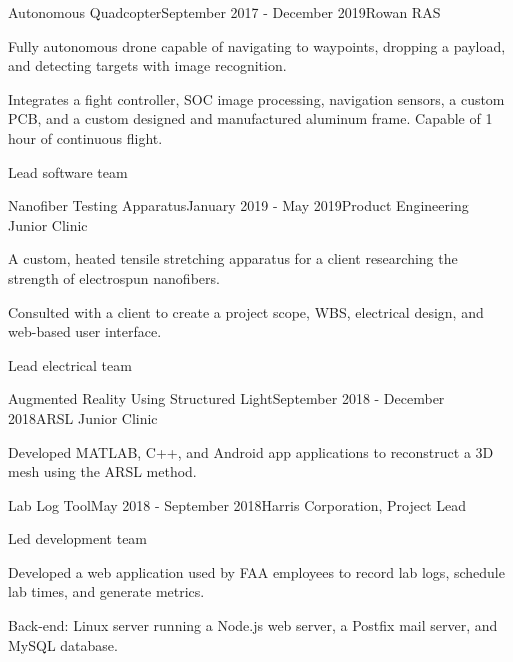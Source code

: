 {  %

  \begin{rSubsection}{Autonomous Quadcopter}{September 2017 - December 2019}{Rowan
    RAS}{}
  \item Fully autonomous drone capable of navigating to waypoints, dropping a
    payload, and detecting targets with image recognition.
  \item Integrates a fight controller, SOC image processing, navigation sensors,
    a custom PCB, and a custom designed and manufactured aluminum frame. Capable
    of 1 hour of continuous flight.
  \item Lead software team
  \end{rSubsection}


  \begin{rSubsection}{Nanofiber Testing Apparatus}{January 2019 - May 2019}{Product Engineering Junior Clinic}{}
  \item A custom, heated tensile stretching apparatus for a client researching the strength of electrospun nanofibers.
  \item Consulted with a client to create a project scope, WBS, electrical
    design, and web-based user interface.
  \item Lead electrical team
  \end{rSubsection}


  \begin{rSubsection}{Augmented Reality Using Structured Light}{September
    2018 - December 2018}{ARSL Junior Clinic}{}
  \item Developed MATLAB, C++, and Android app applications to reconstruct a 3D mesh using the ARSL method.
  \end{rSubsection}


  \begin{rSubsection}{Lab Log Tool}{May 2018 - September 2018}{Harris Corporation, Project Lead}{}
  \item Led development team
  \item Developed a web application used by FAA employees to record lab logs, schedule lab times, and generate metrics.
  \item Back-end: Linux server running a Node.js web server, a Postfix mail server, and MySQL database.
  \end{rSubsection}

  }

